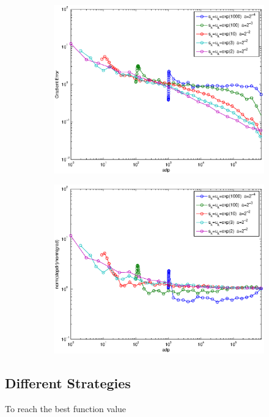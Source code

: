\documentclass[12pt]{article}
\begin{document}
\begin{figure}[H]
	\begin{subfigure}[b]{.5\linewidth}
		        \includegraphics[width=4in]{Figures/18-1-3.eps}
	\end{subfigure}%
	\begin{subfigure}[b]{.5\linewidth}
		        \includegraphics[width=4in]{Figures/18-1-4.eps}
	\end{subfigure}%
	\end{figure}
	
	\subsection{Different Strategies}
	To reach the best function value
\end{document}
